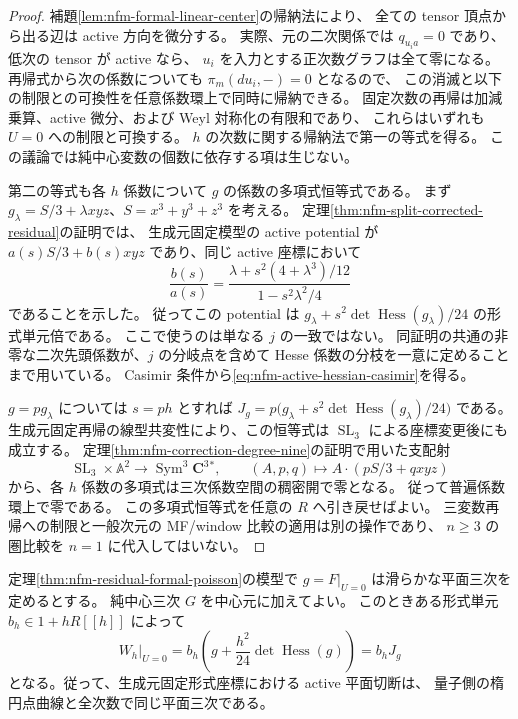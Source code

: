 \begin{proof}
補題\ref{lem:nfm-formal-linear-center}の帰納法により、
全ての tensor 頂点から出る辺は active 方向を微分する。
実際、元の二次関係では $q_{u_i a}=0$ であり、低次の tensor が active なら、
$u_i$ を入力とする正次数グラフは全て零になる。
再帰式から次の係数についても $\pi_m(du_i,-)=0$ となるので、
この消滅と以下の制限との可換性を任意係数環上で同時に帰納できる。
固定次数の再帰は加減乗算、active 微分、および Weyl 対称化の有限和であり、
これらはいずれも $U=0$ への制限と可換する。
$h$ の次数に関する帰納法で第一の等式を得る。
この議論では純中心変数の個数に依存する項は生じない。

第二の等式も各 $h$ 係数について $g$ の係数の多項式恒等式である。
まず $g_\lambda=S/3+\lambda xyz$、$S=x^3+y^3+z^3$ を考える。
定理\ref{thm:nfm-split-corrected-residual}の証明では、
生成元固定模型の active potential が
$a(s)S/3+b(s)xyz$ であり、同じ active 座標において
\[
 \frac{b(s)}{a(s)}
 =\frac{\lambda+s^2(4+\lambda^3)/12}
        {1-s^2\lambda^2/4}
\]
であることを示した。
従ってこの potential は
$g_\lambda+s^2\det\operatorname{Hess}(g_\lambda)/24$ の形式単元倍である。
ここで使うのは単なる $j$ の一致ではない。
同証明の共通の非零な二次先頭係数が、$j$ の分岐点を含めて
Hesse 係数の分枝を一意に定めることまで用いている。
Casimir 条件から\eqref{eq:nfm-active-hessian-casimir}を得る。

$g=p g_\lambda$ については $s=ph$ とすれば
$J_g=p\bigl(g_\lambda+s^2\det\operatorname{Hess}(g_\lambda)/24\bigr)$ である。
生成元固定再帰の線型共変性により、この恒等式は
$\operatorname{SL}_3$ による座標変更後にも成立する。
定理\ref{thm:nfm-correction-degree-nine}の証明で用いた支配射
\[
 \operatorname{SL}_3\times\mathbb A^2\longrightarrow
 \operatorname{Sym}^3\mathbf C^3{}^*,\qquad
 (A,p,q)\longmapsto A\cdot(pS/3+qxyz)
\]
から、各 $h$ 係数の多項式は三次係数空間の稠密開で零となる。
従って普遍係数環上で零である。
この多項式恒等式を任意の $R$ へ引き戻せばよい。
三変数再帰への制限と一般次元の MF/window 比較の適用は別の操作であり、
$n\geq3$ の圏比較を $n=1$ に代入してはいない。
\end{proof}

\begin{proposition}
\label{prop:nfm-residual-active-point-cubic}
定理\ref{thm:nfm-residual-formal-poisson}の模型で
$g=F|_{U=0}$ は滑らかな平面三次を定めるとする。
純中心三次 $G$ を中心元に加えてよい。
このときある形式単元 $b_h\in1+hR[[h]]$ によって
\begin{equation}\label{eq:nfm-residual-active-point-cubic}
 W_h|_{U=0}=b_h\left(g+\frac{h^2}{24}\det\operatorname{Hess}(g)\right)
 =b_hJ_g
\end{equation}
となる。従って、生成元固定形式座標における active 平面切断は、
量子側の楕円点曲線と全次数で同じ平面三次である。
\end{proposition}

